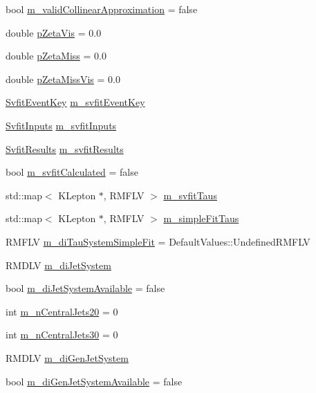 \begin{DoxyCompactItemize}
\item 
bool \hyperlink{classHttProduct_a02e57a61e9244518c03d5b61798b5bfa}{m\_\-validCollinearApproximation} = false
\item 
double \hyperlink{classHttProduct_afc00696a0a2e05df1472fa9023b8ce57}{pZetaVis} = 0.0
\item 
double \hyperlink{classHttProduct_a75672ea51e6fd225c866ade315ba0982}{pZetaMiss} = 0.0
\item 
double \hyperlink{classHttProduct_abba102385ce7747d70c597409670aad8}{pZetaMissVis} = 0.0
\item 
\hyperlink{classSvfitEventKey}{SvfitEventKey} \hyperlink{classHttProduct_a417c202e5be95c4971c52d7f51e92fd5}{m\_\-svfitEventKey}
\item 
\hyperlink{classSvfitInputs}{SvfitInputs} \hyperlink{classHttProduct_a40ff729dcc44f180cb51b6532f5cbcc3}{m\_\-svfitInputs}
\item 
\hyperlink{classSvfitResults}{SvfitResults} \hyperlink{classHttProduct_ae13b0856479d03387c5319192f4c7b77}{m\_\-svfitResults}
\item 
bool \hyperlink{classHttProduct_accdce5615fc40068d8411be69b349f1c}{m\_\-svfitCalculated} = false
\item 
std::map$<$ KLepton $\ast$, RMFLV $>$ \hyperlink{classHttProduct_afb683c52b390000148389a34a3b66a17}{m\_\-svfitTaus}
\item 
std::map$<$ KLepton $\ast$, RMFLV $>$ \hyperlink{classHttProduct_a169a364722b7ef30ef64c0cc9ab41047}{m\_\-simpleFitTaus}
\item 
RMFLV \hyperlink{classHttProduct_a71add7604b6cd190216b8f32420d27aa}{m\_\-diTauSystemSimpleFit} = DefaultValues::UndefinedRMFLV
\item 
RMDLV \hyperlink{classHttProduct_a1384e5a262d702da85fc56f8297e26fe}{m\_\-diJetSystem}
\item 
bool \hyperlink{classHttProduct_a54ab9cbac6194efe53e721aa77aba8f8}{m\_\-diJetSystemAvailable} = false
\item 
int \hyperlink{classHttProduct_a29fc4394e47bea58d6477ee8f7ead81e}{m\_\-nCentralJets20} = 0
\item 
int \hyperlink{classHttProduct_abb86def8117c39e95b455f4e054cea06}{m\_\-nCentralJets30} = 0
\item 
RMDLV \hyperlink{classHttProduct_ad122b9b5efd27c7a930acb0c0c06c9c6}{m\_\-diGenJetSystem}
\item 
bool \hyperlink{classHttProduct_add98b9d1ecc7acd2c77861aa295dea19}{m\_\-diGenJetSystemAvailable} = false
\item 

\end{DoxyCompactItemize}
